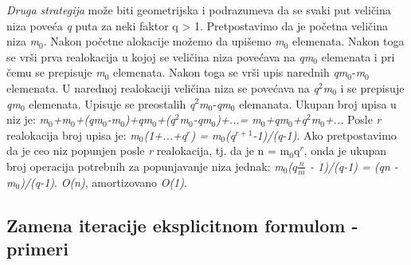 \documentclass{article}
\begin{document}
\newline \textit{Druga strategija} može biti geometrijska i podrazumeva da se svaki put
veličina niza poveća \textit{q} puta za neki faktor q > 1. Pretpostavimo da je početna veličina niza \textit{m}$_0$. Nakon početne alokacije možemo da upišemo \textit{m}$_0$
elemenata. Nakon toga se vrši prva realokacija u kojoj se veličina niza povećava
na \textit{qm}$_0$ elemenata i pri čemu se prepisuje \textit{m}$_0$ elemenata. Nakon toga se vrši upis
narednih \textit{qm}$_0$-\textit{m}$_0$ elemenata. U narednoj realokaciji veličina niza se povećava
na \textit{q}$^2$\textit{m}$_0$ i se prepisuje \textit{qm}$_0$ elemenata. Upisuje se preostalih
\textit{q}$^2$\textit{m}$_0$-\textit{qm}$_0$ elemanata. Ukupan broj upisa u niz je: \textit{m$_0$+m$_0$+(qm$_0$-m$_0$)+qm$_0$+(q$^2$m$_0$-qm$_0$)+...= m$_0$+qm$_0$+q$^2$m$_0$+...} Posle \textit{r} realokacija broj upisa je: \textit{m$_0$(1+...+q$^r$) = m$_0$(q$^{r+1}$-1)/(q-1)}. Ako pretpostavimo da je ceo niz popunjen posle \textit{r} realokacija, tj. da je n = m$_0$q$^r$, onda je ukupan broj operacija potrebnih za popunjavanje niza jednak: \textit{m$_0$($q\frac{n}{m}$ - 1)/(q-1) = (qn - m$_0$)/(q-1)}. \textit{O(n)}, amortizovano \textit{O(1)}.

\subsection{Zamena iteracije eksplicitnom formulom - primeri}
\end{document}
